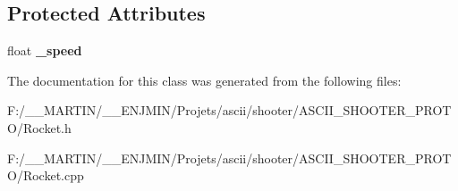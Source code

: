 \subsection*{Protected Attributes}
\begin{DoxyCompactItemize}
\item 
\hypertarget{class_rocket_aa0c252aa8094bc942d743aed643fcf08}{}\label{class_rocket_aa0c252aa8094bc942d743aed643fcf08} 
float {\bfseries \+\_\+speed}
\end{DoxyCompactItemize}


The documentation for this class was generated from the following files\+:\begin{DoxyCompactItemize}
\item 
F\+:/\+\_\+\+\_\+\+M\+A\+R\+T\+I\+N/\+\_\+\+\_\+\+E\+N\+J\+M\+I\+N/\+Projets/ascii/shooter/\+A\+S\+C\+I\+I\+\_\+\+S\+H\+O\+O\+T\+E\+R\+\_\+\+P\+R\+O\+T\+O/Rocket.\+h\item 
F\+:/\+\_\+\+\_\+\+M\+A\+R\+T\+I\+N/\+\_\+\+\_\+\+E\+N\+J\+M\+I\+N/\+Projets/ascii/shooter/\+A\+S\+C\+I\+I\+\_\+\+S\+H\+O\+O\+T\+E\+R\+\_\+\+P\+R\+O\+T\+O/Rocket.\+cpp\end{DoxyCompactItemize}
